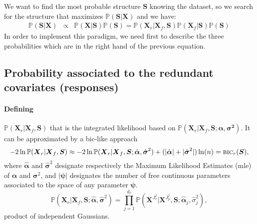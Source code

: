 \documentclass[12pt,a4paper]{report}
\begin{document}
We want to find the most probable structure $\boldsymbol{S}$ knowing the dataset, so we search for the structure that maximizes $\mathbb{P}(\boldsymbol{S}|\boldsymbol{X})$ and we have:	
	\begin{eqnarray}
	 \label{approxBIC} \mathbb{P}(\boldsymbol{S}|\boldsymbol{X})&\propto & \mathbb{P}(\boldsymbol{X}|\boldsymbol{S})\mathbb{P}(\boldsymbol{S})
	=\mathbb{P}(\boldsymbol{X}_r|\boldsymbol{X}_f,\boldsymbol{S})\mathbb{P}(\boldsymbol{X}_f|\boldsymbol{S})\mathbb{P}(\boldsymbol{S})
	\end{eqnarray}
In order to implement this paradigm, we need first to describe the three probabilities which are in the right hand of the previous equation.
	
\subsection{Probability associated to the redundant covariates (responses)}
\paragraph{Defining} $\mathbb{P}(\boldsymbol{X}_r|\boldsymbol{X}_f,\boldsymbol{S})$ that is the integrated likelihood based on $\mathbb{P}(\boldsymbol{X}_r | \boldsymbol{X}_f,\boldsymbol{S};\boldsymbol{\alpha},\boldsymbol{\sigma^2})$. It can be approximated by a {\sc bic}-like approach \cite{Sch1978}
\begin{equation}
-2\ln \mathbb{P}(\boldsymbol{X}_r|\boldsymbol{X}_f,\boldsymbol{S}) \approx -2\ln \mathbb{P}(\boldsymbol{X}_r | \boldsymbol{X}_f,\boldsymbol{S};\hat{\boldsymbol{\alpha}},\hat{\boldsymbol{\sigma}}^2) + (|\hat{\boldsymbol{\alpha}}| + |\hat{\boldsymbol{\sigma}}^2|) \ln(n) = \mbox{{\sc bic}}_r(\boldsymbol{S}), \nonumber
\end{equation}
where $\hat{\boldsymbol{\alpha}}$ and $\hat{\boldsymbol{\sigma}}^2$ designate respectively the Maximum Likelihood Estimates ({\sc mle}) of ${\boldsymbol{\alpha}}$ and ${\boldsymbol{\sigma}}^2$, and $|\boldsymbol{\psi}|$ designates the number of free continuous parameters associated to the space of any parameter $\boldsymbol{\psi}$. 
\begin{displaymath}
\mathbb{P}(\boldsymbol{X}_r | \boldsymbol{X}_f,\boldsymbol{S};\hat{\boldsymbol{\alpha}},\hat{\boldsymbol{\sigma}}^2)=
\prod_{j=1}^{d_r}\mathbb{P}(\boldsymbol{X}^{J_r^j} | \boldsymbol{X}^{J_p^j},\boldsymbol{S};\hat{\boldsymbol{\alpha}}_j,\hat{\sigma}^2_j),
\nonumber
\end{displaymath}
product of independent Gaussians.
	
\end{document}
